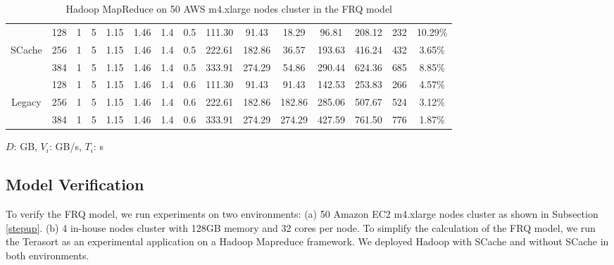 {\begin{table}[!t]
{\begin{tabular}{|c||c|c|c|c|c|c|c||c|c|c|c|c|c|c|}
	\hline
	& 128	& 1 & 5 &	1.15 &	1.46	&	1.4 &	0.5 &	111.30 &	91.43	&	18.29	&	96.81	&	208.12	&	232	&	10.29\%	\\
	SCache
	& 256	& 1 & 5 &	1.15 &	1.46	&	1.4 &	0.5 &	222.61 &	182.86	&	36.57	&	193.63	&	416.24	&	432	&	3.65\%	\\
	& 384	& 1 & 5 &	1.15 &	1.46	&	1.4 &	0.5 &	333.91 &	274.29	&	54.86	&	290.44	&	624.36	&	685 &	8.85\%	\\
	\hline
	& 128	& 1 & 5 &	1.15 &	1.46	&	1.4 &	0.6 &	111.30 &	91.43	&	91.43	&	142.53	&	253.83	&	266 &	4.57\%	\\
	Legacy
	& 256	& 1 & 5 &	1.15 &	1.46	&	1.4 &	0.6 &	222.61 &	182.86	&	182.86	&	285.06	&	507.67	&	524 &	3.12\%	\\
	& 384	& 1 & 5 &	1.15 &	1.46	&	1.4 &	0.6 &	333.91 &	274.29	&	274.29	&	427.59	&	761.50	&	776 &	1.87\%	\\

	\hline
	\end{tabular}
}
\(D\): GB, \(V_{i}\): GB/s, \(T_{i}\): s
\caption{\color{blue}Hadoop MapReduce on 50 AWS m4.xlarge nodes cluster in the FRQ model}
\label{table2}
\end{table}

\subsection{Model Verification}\label{model_verification}
To verify the FRQ model, we run experiments on two environments: (a) 50 Amazon EC2 m4.xlarge nodes cluster as shown in Subsection \ref{stepup}. (b) 4 in-house nodes cluster with 128GB memory and 32 cores per node. To simplify the calculation of the FRQ model, we run the Terasort as an experimental application on a Hadoop Mapreduce framework. We deployed Hadoop with SCache and without SCache in both environments.

}
